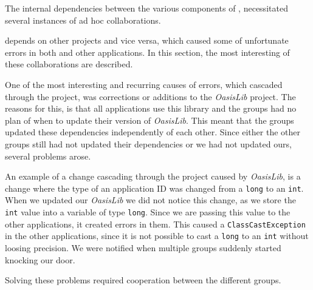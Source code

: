 The internal dependencies between the various components of \giraf, necessitated several instances of ad hoc collaborations.

\launcher depends on other projects and vice versa, which caused some of unfortunate errors in both \launcher and other applications.
In this section, the most interesting of these collaborations are described.

One of the most interesting and recurring causes of errors, which cascaded through the \giraf project, was corrections or additions to the \textit{OasisLib} project.
The reasons for this, is that all applications use this library and the groups had no plan of when to update their version of \textit{OasisLib}.
This meant that the groups updated these dependencies independently of each other.
Since either the other groups still had not updated their dependencies or we had not updated ours, several problems arose.

An example of a change cascading through the project caused by \textit{OasisLib}, is a change where the type of an application ID was changed from a \lstinline|long| to an \lstinline|int|.
When we updated our \textit{OasisLib} we did not notice this change, as we store the \lstinline|int| value into a variable of type \lstinline|long|.
Since we are passing this value to the other applications, it created errors in them.
This caused a \lstinline!ClassCastException! in the other applications, since it is not possible to cast a \lstinline|long| to an \lstinline|int| without loosing precision.
We were notified when multiple groups suddenly started knocking our door.

Solving these problems required cooperation between the different groups.